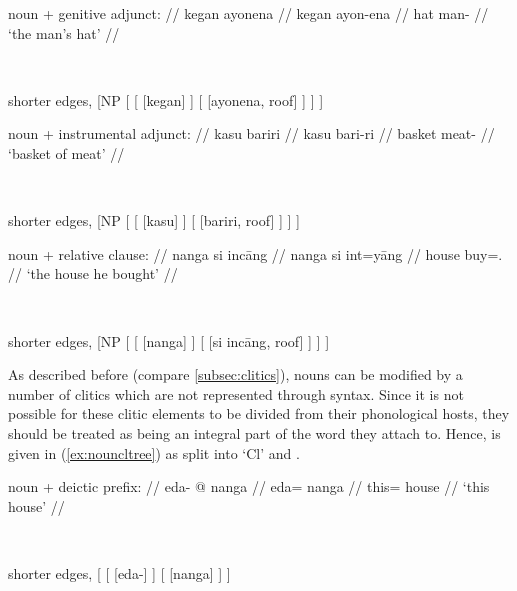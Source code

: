 \a %
	\begin{minipage}[t]{.5\linewidth}
	\begingl
		\glpreamble noun + genitive adjunct: //
		\gla kegan ayonena //
		\glb kegan ayon-ena //
		\glc hat man-\Gen{} //
		\glft `the man's hat' //
	\endgl
	\end{minipage}
	~
	\begin{forest} shorter edges,
	[NP
		[
			[
				[{kegan}]
			]
			[{}
				[{ayonena}, roof]
			]
		]
	]
	\end{forest}

\a %
	\begin{minipage}[t]{.5\linewidth}
	\begingl
		\glpreamble noun + instrumental adjunct: //
		\gla kasu bariri //
		\glb kasu bari-ri //
		\glc basket meat-\Ins{} //
		\glft `basket of meat' //
	\endgl
	\end{minipage}
	~
	\begin{forest} shorter edges,
	[NP
		[
			[
				[{kasu}]
			]
			[{}
				[{bariri}, roof]
			]
		]
	]
	\end{forest}

\a %
	\begin{minipage}[t]{.5\linewidth}
	\begingl
		\glpreamble noun + relative clause: //
		\gla nanga si incāng //
		\glb nanga si int=yāng //
		\glc house \Rel{} buy=\TsgM{}.\Aarg{} //
		\glft `the house he bought' //
	\endgl
	\end{minipage}
	~
	\begin{forest} shorter edges,
	[NP
		[
			[
				[{nanga}]
			]
			[{}
				[{si incāng}, roof]
			]
		]
	]
	\end{forest}

\xe

As described before (compare \autoref{subsec:clitics}), nouns can be modified
by a number of clitics which are not represented through syntax. Since it is
not possible for these clitic elements to be divided from their phonological
hosts, they should be treated as being an integral part of the word they attach
to. Hence,  is given in (\ref{ex:nouncltree}) as split into `Cl' and
.

\pex\label{ex:nouncltree}
\a %
	\begin{minipage}[t]{.5\linewidth}
	\begingl
		\glpreamble noun + deictic prefix: //
		\gla eda- @ nanga //
		\glb eda= nanga //
		\glc this= house //
		\glft `this house' //
	\endgl
	\end{minipage}
	~
	\begin{forest} shorter edges,
	[
		[
			[eda-]
		]
		[
			[nanga]
		]
	]
	\end{forest}

